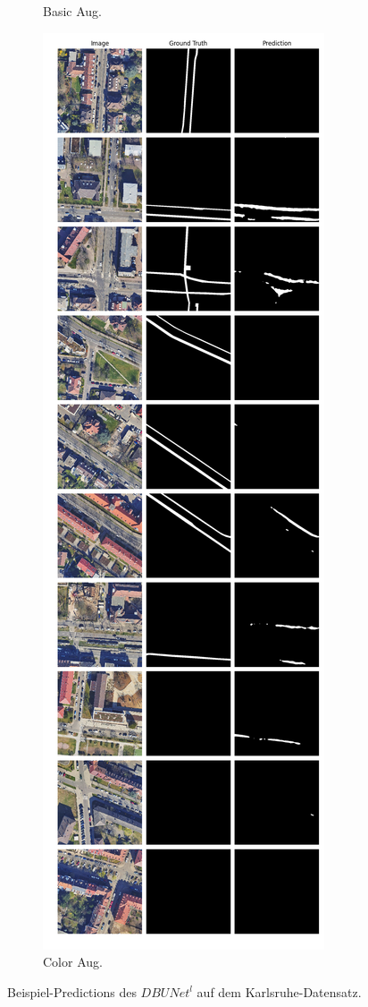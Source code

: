 \begin{figure}
\begin{subfigure}{.4\textwidth}
		\caption{Basic Aug.}
	\end{subfigure}
	\begin{subfigure}{.4\textwidth}
		\centering
		\includegraphics[width=1.\textwidth]{Bilder/karlsruhe-color-samples/dbunet-l.png}
		\caption{Color Aug.}
	\end{subfigure}
	\caption{Beispiel-Predictions des $DBUNet^l$ auf dem Karlsruhe-Datensatz.}
	\label{fig:ka-samples-dbunet-l}
	\end{figure}
	
